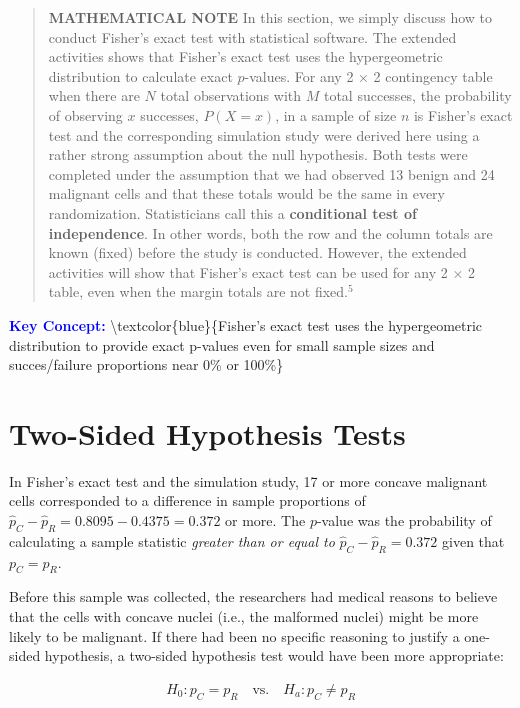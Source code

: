 \documentclass[
]{book}
\begin{document}
\begin{quote}
\textbf{MATHEMATICAL NOTE} In this section, we simply discuss how to conduct Fisher's exact test with statistical software. The extended activities shows that Fisher's exact test uses the hypergeometric distribution to calculate exact \(p\)-values. For any 2 × 2 contingency table when there are \(N\) total observations with \(M\) total successes, the probability of observing \(x\) successes, \(P(X = x)\), in a sample of size \(n\) is Fisher's exact test and the corresponding simulation study were derived here using a rather strong assumption about the null hypothesis. Both tests were completed under the assumption that we had observed 13 benign and 24 malignant cells and that these totals would be the same in every randomization. Statisticians call this a \textbf{conditional test of independence}. In other words, both the row and the column totals are known (fixed) before the study is conducted. However, the extended activities will show that Fisher's exact test can be used for any 2 \(\times\) 2 table, even when the margin totals are not fixed.\(^5\)
\end{quote}

\textbf{\textcolor{blue}{Key Concept:}}
\textbackslash textcolor\{blue\}\{Fisher's exact test uses the hypergeometric distribution to provide exact p-values even for small sample sizes and succes/failure proportions near 0\% or 100\%\}

\hypertarget{two-sided-hypothesis-tests}{%
\section{Two-Sided Hypothesis Tests}\label{two-sided-hypothesis-tests}}

In Fisher's exact test and the simulation study, 17 or more concave malignant cells corresponded to a difference in sample proportions of \(\hat p_C - \hat p_R = 0.8095 - 0.4375 = 0.372\) or more. The \(p\)-value was the probability of calculating a sample statistic \emph{greater than or equal to} \(\hat p_C - \hat p_R = 0.372\) given that \(p_C = p_R\).

Before this sample was collected, the researchers had medical reasons to believe that the cells with concave nuclei (i.e., the malformed nuclei) might be more likely to be malignant. If there had been no specific reasoning to justify a one-sided hypothesis, a two-sided hypothesis test would have been more appropriate:

\begin{align}\label{5.2}
H_0: p_C = p_R \quad\text{vs.}\quad H_a: p_C \neq p_R 
\tag{5.2}
\end{align}
\end{document}
